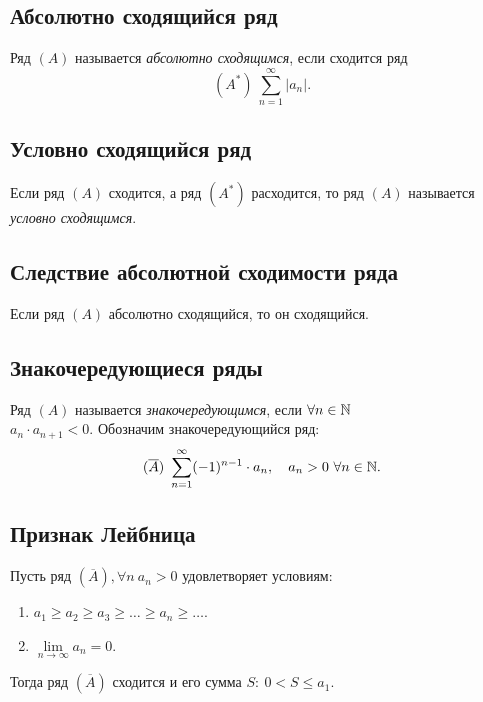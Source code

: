 \subsection{Абсолютно сходящийся ряд}

\begin{definition}
    Ряд $(A)$ называется \emph{абсолютно сходящимся}, если сходится ряд
    \[
        (A^*) \ \sum_{n=1}^{\infty}|a_n|.
    \]
\end{definition}

\subsection{Условно сходящийся ряд}

\begin{definition}
    Если ряд $(A)$ сходится, а ряд $(A^*)$ расходится, то ряд $(A)$ называется \emph{условно сходящимся}.
\end{definition}

\subsection{Следствие абсолютной сходимости ряда}

\begin{statement}
    Если ряд $(A)$ абсолютно сходящийся, то он сходящийся.
\end{statement}

\subsection{Знакочередующиеся ряды}

\begin{definition}
    Ряд $(A)$ называется \emph{знакочередующимся}, если $\forall n \in \mathbb{N} $ \\ $ a_n \cdot a_{n+1} < 0$. Обозначим знакочередующийся ряд:
    \[
        (\overline{A}) \ \sum_{n=1}^{\infty}(-1)^{n-1}\cdot a_n, \quad a_n > 0 \ \forall n \in\N.
    \]
\end{definition}

\subsection{Признак Лейбница}

\begin{theorem}
    Пусть ряд $(\overline{A}), \forall n \ a_n > 0 $ удовлетворяет условиям:
    \begin{enumerate}
        \item $a_1 \geqslant a_2 \geqslant a_3 \geqslant \ldots \geqslant a_n \geqslant \ldots$.
        \item $\underset{n\rightarrow\infty}{\lim} a_n = 0$.
    \end{enumerate}

    Тогда ряд $(\overline{A})$ сходится и его сумма $S: \ 0 < S \leqslant a_1$.
\end{theorem}

